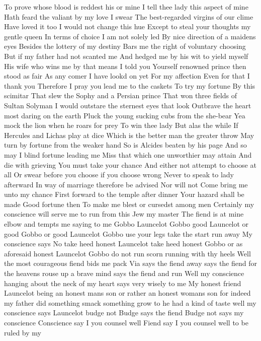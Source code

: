 To prove whose blood is reddest his or mine 
I tell thee lady this aspect of mine 
Hath feard the valiant by my love I swear 
The best-regarded virgins of our clime 
Have loved it too I would not change this hue 
Except to steal your thoughts my gentle queen 
In terms of choice I am not solely led 
By nice direction of a maidens eyes 
Besides the lottery of my destiny 
Bars me the right of voluntary choosing 
But if my father had not scanted me 
And hedged me by his wit to yield myself 
His wife who wins me by that means I told you 
Yourself renowned prince then stood as fair 
As any comer I have lookd on yet 
For my affection 
Even for that I thank you 
Therefore I pray you lead me to the caskets 
To try my fortune By this scimitar 
That slew the Sophy and a Persian prince 
That won three fields of Sultan Solyman 
I would outstare the sternest eyes that look 
Outbrave the heart most daring on the earth 
Pluck the young sucking cubs from the she-bear 
Yea mock the lion when he roars for prey 
To win thee lady But alas the while 
If Hercules and Lichas play at dice 
Which is the better man the greater throw 
May turn by fortune from the weaker hand 
So is Alcides beaten by his page 
And so may I blind fortune leading me 
Miss that which one unworthier may attain 
And die with grieving 
You must take your chance 
And either not attempt to choose at all 
Or swear before you choose if you choose wrong 
Never to speak to lady afterward 
In way of marriage therefore be advised 
Nor will not Come bring me unto my chance 
First forward to the temple after dinner 
Your hazard shall be made 
Good fortune then 
To make me blest or cursedst among men 
Certainly my conscience will serve me to run from 
this Jew my master The fiend is at mine elbow and 
tempts me saying to me Gobbo Launcelot Gobbo good 
Launcelot or good Gobbo or good Launcelot 
Gobbo use your legs take the start run away My 
conscience says No take heed honest Launcelot 
take heed honest Gobbo or as aforesaid honest 
Launcelot Gobbo do not run scorn running with thy 
heels Well the most courageous fiend bids me 
pack Via says the fiend away says the 
fiend for the heavens rouse up a brave mind 
says the fiend and run Well my conscience 
hanging about the neck of my heart says very wisely 
to me My honest friend Launcelot being an honest 
mans son or rather an honest womans son for 
indeed my father did something smack something 
grow to he had a kind of taste well my conscience 
says Launcelot budge not Budge says the 
fiend Budge not says my conscience 
Conscience say I you counsel well Fiend 
say I you counsel well to be ruled by my 
